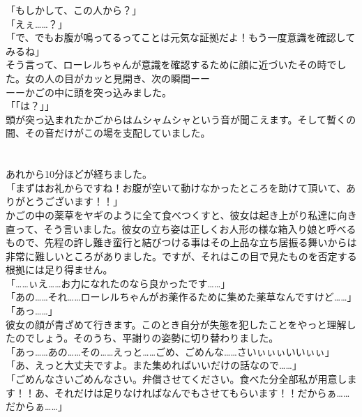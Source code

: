 \documentclass[oneside, a4paper]{jsbook}
\begin{document}
\noindent
「もしかして、この人から？」\\
「えぇ……？」\\
「で、でもお腹が鳴ってるってことは元気な証拠だよ！もう一度意識を確認してみるね」\\

そう言って、ローレルちゃんが意識を確認するために顔に近づいたその時でした。女の人の目がカッと見開き、次の瞬間ーー\\

ーーかごの中に頭を突っ込みました。\\

\noindent
「「は？」」\\

頭が突っ込まれたかごからはムシャムシャという音が聞こえます。そして暫くの間、その音だけがこの場を支配していました。\\\\\\

あれから10分ほどが経ちました。\\

\noindent
「まずはお礼からですね！お腹が空いて動けなかったところを助けて頂いて、ありがとうございます！！」\\

かごの中の薬草をヤギのように全て食べつくすと、彼女は起き上がり私達に向き直って、そう言いました。彼女の立ち姿は正しくお人形の様な箱入り娘と呼べるもので、先程の許し難き蛮行と結びつける事はその上品な立ち居振る舞いからは非常に難しいところがありました。ですが、それはこの目で見たものを否定する根拠には足り得ません。\\

\noindent
「……ぃえ……お力になれたのなら良かったです……」\\
「あの……それ……ローレルちゃんがお薬作るために集めた薬草なんですけど……」\\
「あっ……」\\

彼女の顔が青ざめて行きます。このとき自分が失態を犯したことをやっと理解したのでしょう。そのうち、平謝りの姿勢に切り替わりました。\\

\noindent
「あっ……あの……その……えっと……ごめ、ごめんな……さいぃぃぃいいぃぃ」\\
「あ、えっと大丈夫ですよ。また集めればいいだけの話なので……」\\
「ごめんなさいごめんなさい。弁償させてください。食べた分全部私が用意します！！あ、それだけは足りなければなんでもさせてもらいます！！だからぁ……だからぁ……」\\
\end{document}
